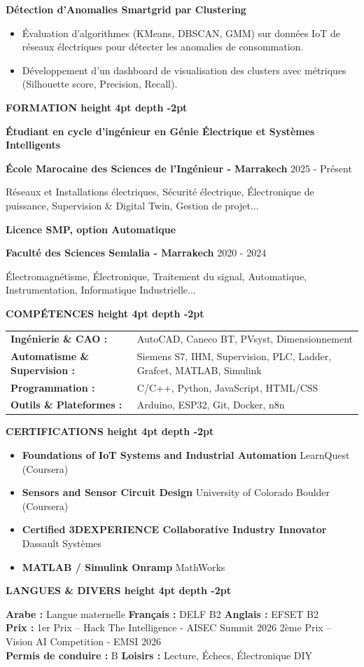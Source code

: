 \documentclass[10pt,a4paper]{../../altacv}
\renewcommand{\cvsection}[2][]{%
  \medskip%
  {\color{heading}\LARGE\bfseries #2 \hspace{0.2em}\leaders\vrule height 4pt depth -2pt\hfill\mbox{}}\par\smallskip
}
\renewcommand{\cvevent}[4]{%
  {\large\bfseries\color{accent}#1\par}
  \smallskip\normalsize
  \ifstrequal{#2}{}{}{%
    \textbf{\color{emphasis}#2\ifstrequal{#4}{}{}{ - #4}}%
  }%
  \hfill
  \ifstrequal{#3}{}{}{{\small#3}}%
  \par\smallskip
}
\begin{document}
{\large\bfseries\color{accent} Détection d'Anomalies Smartgrid par Clustering}\\[0.05cm]
\begin{itemize}
  \item Évaluation d'algorithmes (KMeans, DBSCAN, GMM) sur données IoT de réseaux électriques pour détecter les anomalies de consommation.
  \item Développement d'un dashboard de visualisation des clusters avec métriques (Silhouette score, Precision, Recall).
\end{itemize}

\cvsection{FORMATION}
\cvevent{Étudiant en cycle d'ingénieur en Génie Électrique et Systèmes Intelligents}{École Marocaine des Sciences de l'Ingénieur}{2025 - Présent}{Marrakech}
\small Réseaux et Installations électriques, Sécurité électrique, Électronique de puissance, Supervision \& Digital Twin, Gestion de projet...

\cvevent{Licence SMP, option Automatique}{Faculté des Sciences Semlalia}{2020 - 2024}{Marrakech}
\small Électromagnétisme, Électronique, Traitement du signal, Automatique, Instrumentation, Informatique Industrielle...

\cvsection{COMPÉTENCES}
\begin{tabular}{@{}ll@{}}
\textbf{Ingénierie \& CAO :} & AutoCAD, Caneco BT, PVsyst, Dimensionnement \\[1pt]
\textbf{Automatisme \& Supervision :} & Siemens S7, IHM, Supervision, PLC, Ladder, Grafcet, MATLAB, Simulink \\[1pt]
\textbf{Programmation :} & C/C++, Python, JavaScript, HTML/CSS \\[1pt]
\textbf{Outils \& Plateformes :} & Arduino, ESP32, Git, Docker, n8n \\
\end{tabular}

\cvsection{CERTIFICATIONS}
\begin{itemize}[leftmargin=*, label=\textbullet, itemsep=2pt]
  \item \textbf{Foundations of IoT Systems and Industrial Automation} \hfill {\color{emphasis}LearnQuest (Coursera)}
  \item \textbf{Sensors and Sensor Circuit Design} \hfill {\color{emphasis}University of Colorado Boulder (Coursera)}
  \item \textbf{Certified 3DEXPERIENCE Collaborative Industry Innovator} \hfill {\color{emphasis}Dassault Systèmes}
  \item \textbf{MATLAB / Simulink Onramp} \hfill {\color{emphasis}MathWorks}
\end{itemize}

\cvsection{LANGUES \& DIVERS}
\textbf{Arabe :} Langue maternelle \hfill \textbf{Français :} DELF B2 \hfill \textbf{Anglais :} EFSET B2\\[2pt]
\textbf{Prix :} 1er Prix -- Hack The Intelligence - AISEC Summit 2026 \hfill 2ème Prix -- Vision AI Competition - EMSI 2026\\[2pt]
\textbf{Permis de conduire :} B \hfill \textbf{Loisirs :} Lecture, Échecs, Électronique DIY
\end{document}
